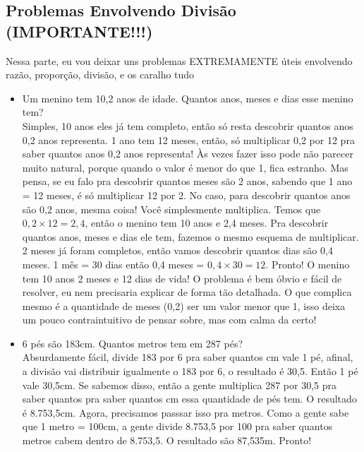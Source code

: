 \documentclass{article}
\begin{document}
\subsection{Problemas Envolvendo Divisão (IMPORTANTE!!!)}
Nessa parte, eu vou deixar uns problemas EXTREMAMENTE úteis envolvendo razão, proporção, divisão, e os caralho tudo

\begin{itemize}
    \item Um menino tem 10,2 anos de idade. Quantos anos, meses e dias esse menino tem?
    \\[5pt]
    Simples, 10 anos eles já tem completo, então só resta descobrir quantos anos 0,2 anos representa. 1 ano tem 12 meses, então, só multiplicar 0,2 por 12 pra saber quantos anos 0,2 anos representa! Às vezes fazer isso pode não parecer muito natural, porque quando o valor é menor do que 1, fica estranho. Mas pensa, se eu falo pra descobrir quantos meses são 2 anos, sabendo que 1 ano = 12 meses, é só multiplicar 12 por 2. No caso, para descobrir quantos anos são 0,2 anos, mesma coisa! Você simplesmente multiplica. Temos que $0,2 \times 12 = 2,4$, então o menino tem 10 anos e 2,4 meses. Pra descobrir quantos anos, meses e dias ele tem, fazemos o mesmo esquema de multiplicar. 2 meses já foram completos, então vamos descobrir quantos dias são 0,4 meses. 1 mês = 30 dias então 0,4 meses = $0,4 \times30 = 12$. Pronto! O menino tem 10 anos 2 meses e 12 dias de vida! O problema é bem óbvio e fácil de resolver, eu nem precisaria explicar de forma tão detalhada. O que complica mesmo é a quantidade de meses (0,2) ser um valor menor que 1, isso deixa um pouco contraintuitivo de pensar sobre, mas com calma da certo!

    \item 6 pés são 183cm. Quantos metros tem em 287 pés?
    \\[5pt]
    Absurdamente fácil, divide 183 por 6 pra saber quantos cm vale 1 pé, afinal, a divisão vai distribuir igualmente o 183 por 6, o resultado é 30,5. Então 1 pé vale 30,5cm. Se sabemos disso, então a gente multiplica 287 por 30,5 pra saber quantos pra saber quantos cm essa quantidade de pés tem. O resultado é 8.753,5cm. Agora, precisamos passsar isso pra metros. Como a gente sabe que 1 metro = 100cm, a gente divide 8.753,5 por 100 pra saber quantos metros cabem dentro de 8.753,5. O resultado são 87,535m. Pronto!


\end{itemize}
\end{document}
